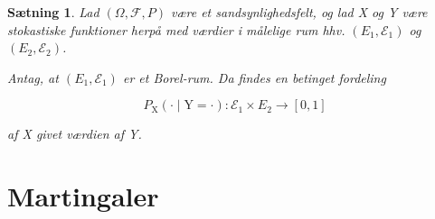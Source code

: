 \documentclass{article}
\newcommand{\1}{\mathbbm{1}}
\theoremstyle{boxed}
\newtheorem{proposition}[theorem]{Sætning}
\begin{document}
\begin{theorem-box}
    \begin{proposition}
        Lad $(\Omega, \mathcal{F}, P)$ være et sandsynlighedsfelt, og lad X og Y være stokastiske funktioner herpå med værdier i målelige rum hhv. $\left(E_1, \mathcal{E}_1\right)$ og $\left(E_2, \mathcal{E}_2\right)$.

Antag, at $\left(E_1, \mathcal{E}_1\right)$ er et Borel-rum.
Da findes en betinget fordeling

$$
P_{\mathrm{X}}(\cdot \mid \mathrm{Y}=\cdot): \mathcal{E}_1 \times E_2 \rightarrow[0,1]
$$

af X givet værdien af Y.
    \end{proposition}
\end{theorem-box}

\section{Martingaler}
\end{document}
